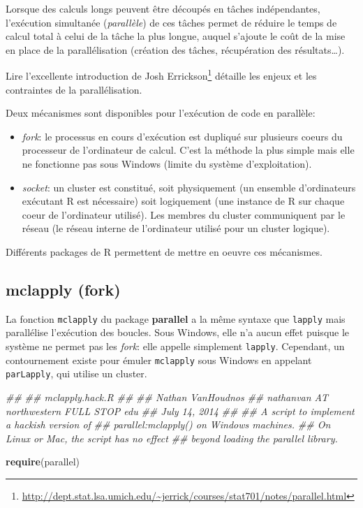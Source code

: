 \documentclass[
  12pt,
  french,
  a4paper,
  extrafontsizes,onecolumn,openright
  ]{memoir}
\newenvironment{Shaded}{\begin{snugshade}}{\end{snugshade}}
\newcommand{\CommentTok}[1]{\textcolor[rgb]{0.56,0.35,0.01}{\textit{#1}}}
\newcommand{\KeywordTok}[1]{\textcolor[rgb]{0.13,0.29,0.53}{\textbf{#1}}}
\newcommand{\NormalTok}[1]{#1}
\providecommand{\tightlist}{%
  \setlength{\itemsep}{0pt}\setlength{\parskip}{0pt}}
\begin{document}
Lorsque des calculs longs peuvent être découpés en tâches indépendantes, l'exécution simultanée (\emph{parallèle}) de ces tâches permet de réduire le temps de calcul total à celui de la tâche la plus longue, auquel s'ajoute le coût de la mise en place de la parallélisation (création des tâches, récupération des résultats\ldots).

Lire l'excellente introduction de Josh Errickson\footnote{\url{http://dept.stat.lsa.umich.edu/~jerrick/courses/stat701/notes/parallel.html}} détaille les enjeux et les contraintes de la parallélisation.

Deux mécanismes sont disponibles pour l'exécution de code en parallèle:

\begin{itemize}
\tightlist
\item
  \emph{fork}: le processus en cours d'exécution est dupliqué sur plusieurs coeurs du processeur de l'ordinateur de calcul.
  C'est la méthode la plus simple mais elle ne fonctionne pas sous Windows (limite du système d'exploitation).
\item
  \emph{socket}: un cluster est constitué, soit physiquement (un ensemble d'ordinateurs exécutant R est nécessaire) soit logiquement (une instance de R sur chaque coeur de l'ordinateur utilisé).
  Les membres du cluster communiquent par le réseau (le réseau interne de l'ordinateur utilisé pour un cluster logique).
\end{itemize}

Différents packages de R permettent de mettre en oeuvre ces mécanismes.

\hypertarget{mclapply-fork}{%
\subsection{mclapply (fork)}\label{mclapply-fork}}

La fonction \texttt{mclapply} du package \textbf{parallel} a la même syntaxe que \texttt{lapply} mais parallélise l'exécution des boucles.
Sous Windows, elle n'a aucun effet puisque le système ne permet pas les \emph{fork}: elle appelle simplement \texttt{lapply}.
Cependant, un contournement existe pour émuler \texttt{mclapply} sous Windows en appelant \texttt{parLapply}, qui utilise un cluster.

\scriptsize

\begin{Shaded}
\begin{Highlighting}[]
\CommentTok{##}
\CommentTok{## mclapply.hack.R}
\CommentTok{##}
\CommentTok{## Nathan VanHoudnos}
\CommentTok{## nathanvan AT northwestern FULL STOP edu}
\CommentTok{## July 14, 2014}
\CommentTok{##}
\CommentTok{## A script to implement a hackish version of }
\CommentTok{## parallel:mclapply() on Windows machines.}
\CommentTok{## On Linux or Mac, the script has no effect}
\CommentTok{## beyond loading the parallel library. }

\KeywordTok{require}\NormalTok{(parallel)    }
\end{Highlighting}
\end{Shaded}
\end{document}
